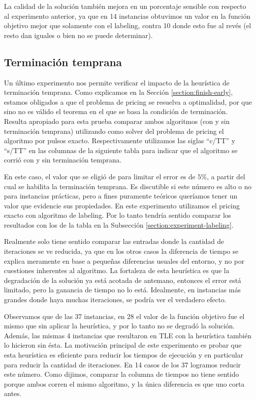 La calidad de la solución también mejora en un porcentaje sensible con respecto al experimento anterior, ya que en 14 instancias obtuvimos un valor en la función objetivo mejor que solamente con el labeling, contra 10 donde esto fue al revés (el resto dan iguales o bien no se puede determinar).


\subsection{Terminación temprana}

Un último experimento nos permite verificar el impacto de la heurística de terminación temprana. Como explicamos en la Sección \ref{section:finish-early}, estamos obligados a que el problema de pricing se resuelva a optimalidad, por que sino no es válido el teorema en el que se basa la condición de terminación. Resulta apropiado para esta prueba comparar ambos algoritmos (con y sin terminación temprana) utilizando como solver del problema de pricing el algoritmo por pulsos exacto. Respectivamente utilizamos las siglas ``c/TT'' y ``s/TT'' en las columnas de la siguiente tabla para indicar que el algoritmo se corrió con y sin terminación temprana. 

En este caso, el valor que se eligió de para limitar el error es de $5\%$, a partir del cual se habilita la terminación temprana. Es discutible si este número es alto o no para instancias prácticas, pero a fines puramente teóricos queríamos tener un valor que evidencie sus propiedades. En este experimento utilizamos el pricing exacto con algoritmo de labeling. Por lo tanto tendría sentido comparar los resultados con los de la tabla en la Subsección \ref{section:experiment-labeling}.

Realmente solo tiene sentido comparar las entradas donde la cantidad de iteraciones se ve reducida, ya que en los otros casos la diferencia de tiempo se explica meramente en base a pequeñas diferencias usuales del entorno, y no por cuestiones inherentes al algoritmo. La fortaleza de esta heurística es que la degradación de la solución ya está acotada de antemano, entonces el error está limitado, pero la ganancia de tiempo no lo está. Idealmente, en instancias más grandes donde haya muchas iteraciones, se podría ver el verdadero efecto.

Observamos que de las 37 instancias, en 28 el valor de la función objetivo fue el mismo que sin aplicar la heurística, y por lo tanto no se degradó la solución. Además, las mismas 4 instancias que resultaron en TLE con la heurística también lo hicieron sin ésta. La motivación principal de este experimento es probar que esta heurística es eficiente para reducir los tiempos de ejecución y en particular para reducir la cantidad de iteraciones. En 14 casos de los 37 logramos reducir este número. Como dijimos, comparar la columna de tiempos no tiene sentido porque ambos corren el mismo algoritmo, y la única diferencia es que uno corta antes. 

